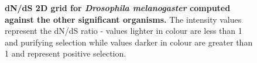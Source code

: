\documentclass{article}
\begin{document}
\begin{figure}[H]
\centering
{}
\caption{\textbf{dN/dS 2D grid for \textit{Drosophila melanogaster} computed against the other significant organisms.} The intensity values represent the dN/dS ratio - values lighter in colour are less than 1 and purifying selection while values darker in colour are greater than 1 and represent positive selection.}
\label{sup_fig_24}
\end{figure}
\end{document}
